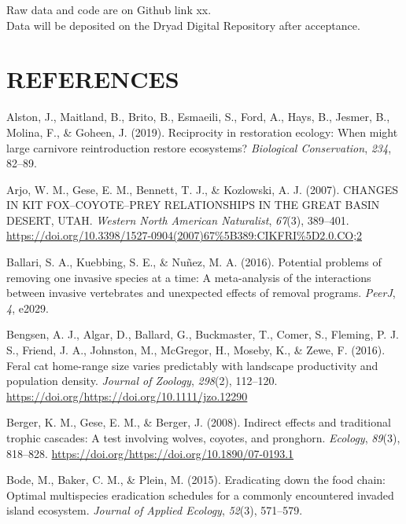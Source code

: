 \documentclass[]{elsarticle} %
\begin{document}
Raw data and code are on Github link xx.\\
Data will be deposited on the Dryad Digital Repository after acceptance.

\newpage

\hypertarget{references}{%
\section*{REFERENCES}\label{references}}

\hypertarget{refs}{}
\leavevmode\hypertarget{ref-alston2019}{}%
Alston, J., Maitland, B., Brito, B., Esmaeili, S., Ford, A., Hays, B., Jesmer, B., Molina, F., \& Goheen, J. (2019). Reciprocity in restoration ecology: When might large carnivore reintroduction restore ecosystems? \emph{Biological Conservation}, \emph{234}, 82--89.

\leavevmode\hypertarget{ref-arjo2007}{}%
Arjo, W. M., Gese, E. M., Bennett, T. J., \& Kozlowski, A. J. (2007). CHANGES IN KIT FOX--COYOTE--PREY RELATIONSHIPS IN THE GREAT BASIN DESERT, UTAH. \emph{Western North American Naturalist}, \emph{67}(3), 389--401. \url{https://doi.org/10.3398/1527-0904(2007)67\%5B389:CIKFRI\%5D2.0.CO;2}

\leavevmode\hypertarget{ref-ballari2016}{}%
Ballari, S. A., Kuebbing, S. E., \& Nuñez, M. A. (2016). Potential problems of removing one invasive species at a time: A meta-analysis of the interactions between invasive vertebrates and unexpected effects of removal programs. \emph{PeerJ}, \emph{4}, e2029.

\leavevmode\hypertarget{ref-https:ux2fux2fdoi.orgux2f10.1111ux2fjzo.12290}{}%
Bengsen, A. J., Algar, D., Ballard, G., Buckmaster, T., Comer, S., Fleming, P. J. S., Friend, J. A., Johnston, M., McGregor, H., Moseby, K., \& Zewe, F. (2016). Feral cat home-range size varies predictably with landscape productivity and population density. \emph{Journal of Zoology}, \emph{298}(2), 112--120. \url{https://doi.org/https://doi.org/10.1111/jzo.12290}

\leavevmode\hypertarget{ref-berger2008indirect}{}%
Berger, K. M., Gese, E. M., \& Berger, J. (2008). Indirect effects and traditional trophic cascades: A test involving wolves, coyotes, and pronghorn. \emph{Ecology}, \emph{89}(3), 818--828. \url{https://doi.org/https://doi.org/10.1890/07-0193.1}

\leavevmode\hypertarget{ref-bode2015}{}%
Bode, M., Baker, C. M., \& Plein, M. (2015). Eradicating down the food chain: Optimal multispecies eradication schedules for a commonly encountered invaded island ecosystem. \emph{Journal of Applied Ecology}, \emph{52}(3), 571--579.
\end{document}
